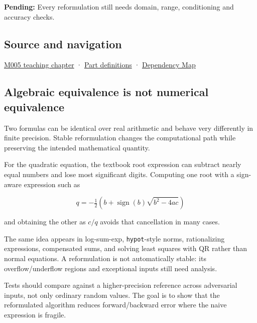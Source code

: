 \textbf{Pending:} Every reformulation still needs domain, range, conditioning and accuracy checks.

\subsection{Source and navigation}\label{appendix-d7f8ba961670-source-and-navigation}

\hyperref[01-foundations-i-ch001-when-arithmetic-meets-uncertainty]{M005 teaching chapter} · \hyperref[appendix-fd090d982a15-m005---parts-77-88]{Part definitions} · \hyperref[appendix-4ad47bdd269a]{Dependency Map}

\subsection{Algebraic equivalence is not numerical equivalence}\label{appendix-d7f8ba961670-algebraic-equivalence-is-not-numerical-equivalence}

Two formulas can be identical over real arithmetic and behave very differently in finite precision. Stable reformulation changes the computational path while preserving the intended mathematical quantity.

For the quadratic equation, the textbook root expression can subtract nearly equal numbers and lose most significant digits. Computing one root with a sign-aware expression such as

\[
q=-\tfrac12\left(b+\operatorname{sign}(b)\sqrt{b^2-4ac}\right)
\]

and obtaining the other as \(c/q\) avoids that cancellation in many cases.

The same idea appears in log-sum-exp, \texttt{hypot}-style norms, rationalizing expressions, compensated sums, and solving least squares with QR rather than normal equations. A reformulation is not automatically stable: its overflow/underflow regions and exceptional inputs still need analysis.

Tests should compare against a higher-precision reference across adversarial inputs, not only ordinary random values. The goal is to show that the reformulated algorithm reduces forward/backward error where the naive expression is fragile.
